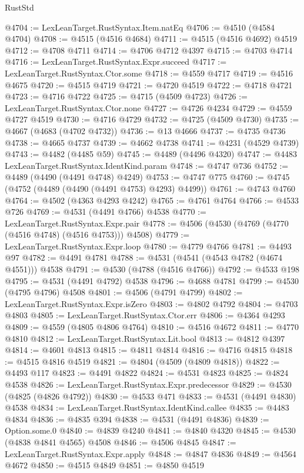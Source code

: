 \begin{lexlean}{RustStd}
\begin{coremodule}
@4704 := LexLeanTarget.RustSyntax.Item.natEq
@4706 := @4510 (@4584 @4704)
@4708 := @4515 (@4516 @4684)
@4711 := @4515 (@4516 @4692) @4519
@4712 := @4708 @4711
@4714 := @4706 @4712 @4397
@4715 := @4703 @4714
@4716 := LexLeanTarget.RustSyntax.Expr.succeed
@4717 := LexLeanTarget.RustSyntax.Ctor.some
@4718 := @4559 @4717
@4719 := @4516 @4675
@4720 := @4515 @4719
@4721 := @4720 @4519
@4722 := @4718 @4721
@4723 := @4716 @4722
@4725 := @4715 (@4509 @4723)
@4726 := LexLeanTarget.RustSyntax.Ctor.none
@4727 := @4726 @4234
@4729 := @4559 @4727 @4519
@4730 := @4716 @4729
@4732 := @4725 (@4509 @4730)
@4735 := @4667 (@4683 (@4702 @4732))
@4736 := @13 @4666
@4737 := @4735 @4736
@4738 := @4665 @4737
@4739 := @4662 @4738
@4741 := @4231 (@4529 @4739)
@4743 := @4482 (@4485 @59)
@4745 := @4489 (@4496 @4320)
@4747 := @4483 LexLeanTarget.RustSyntax.IdentKind.param
@4748 := @4747 @736
@4752 := @4489 (@4490 (@4491 @4748) @4249)
@4753 := @4747 @775
@4760 := @4745 (@4752 (@4489 (@4490 (@4491 @4753) @4293) @4499))
@4761 := @4743 @4760
@4764 := @4502 (@4363 @4293 @4242)
@4765 := @4761 @4764
@4766 := @4533 @726
@4769 := @4531 (@4491 @4766) @4538
@4770 := LexLeanTarget.RustSyntax.Expr.pair
@4778 := @4506 (@4530 (@4769 (@4770 (@4516 @4748) (@4516 @4753))) @4508)
@4779 := LexLeanTarget.RustSyntax.Expr.loop
@4780 := @4779 @4766
@4781 := @4493 @97
@4782 := @4491 @4781
@4788 := @4531 (@4541 (@4543 @4782 (@4674 @4551))) @4538
@4791 := @4530 (@4788 (@4516 @4766))
@4792 := @4533 @198
@4795 := @4531 (@4491 @4792) @4538
@4796 := @4688 @4781
@4799 := @4530 (@4795 @4796) @4508
@4801 := @4506 (@4791 @4799)
@4802 := LexLeanTarget.RustSyntax.Expr.isZero
@4803 := @4802 @4792
@4804 := @4703 @4803
@4805 := LexLeanTarget.RustSyntax.Ctor.err
@4806 := @4364 @4293
@4809 := @4559 (@4805 @4806 @4764)
@4810 := @4516 @4672
@4811 := @4770 @4810
@4812 := LexLeanTarget.RustSyntax.Lit.bool
@4813 := @4812 @4397
@4814 := @4601 @4813
@4815 := @4811 @4814
@4816 := @4716 @4815
@4818 := @4515 @4816 @4519
@4821 := @4804 (@4509 (@4809 @4818))
@4822 := @4493 @117
@4823 := @4491 @4822
@4824 := @4531 @4823
@4825 := @4824 @4538
@4826 := LexLeanTarget.RustSyntax.Expr.predecessor
@4829 := @4530 (@4825 (@4826 @4792))
@4830 := @4533 @471
@4833 := @4531 (@4491 @4830) @4538
@4834 := LexLeanTarget.RustSyntax.IdentKind.callee
@4835 := @4483 @4834
@4836 := @4835 @394
@4838 := @4531 (@4491 @4836)
@4839 := Option.some.{0}
@4840 := @4839 @4240
@4841 := @4840 @4320
@4845 := @4530 (@4838 @4841 @4565) @4508
@4846 := @4506 @4845
@4847 := LexLeanTarget.RustSyntax.Expr.apply
@4848 := @4847 @4836
@4849 := @4564 @4672
@4850 := @4515 @4849
@4851 := @4850 @4519

\end{coremodule}
\end{lexlean}
